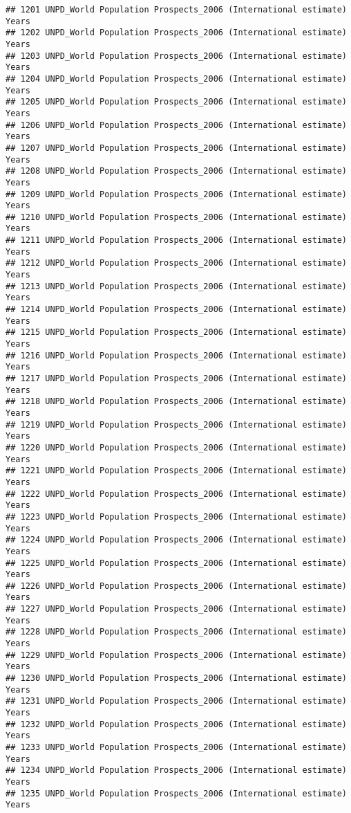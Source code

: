 \documentclass[]{article}
\begin{document}
\begin{verbatim}
## 1201 UNPD_World Population Prospects_2006 (International estimate) Years
## 1202 UNPD_World Population Prospects_2006 (International estimate) Years
## 1203 UNPD_World Population Prospects_2006 (International estimate) Years
## 1204 UNPD_World Population Prospects_2006 (International estimate) Years
## 1205 UNPD_World Population Prospects_2006 (International estimate) Years
## 1206 UNPD_World Population Prospects_2006 (International estimate) Years
## 1207 UNPD_World Population Prospects_2006 (International estimate) Years
## 1208 UNPD_World Population Prospects_2006 (International estimate) Years
## 1209 UNPD_World Population Prospects_2006 (International estimate) Years
## 1210 UNPD_World Population Prospects_2006 (International estimate) Years
## 1211 UNPD_World Population Prospects_2006 (International estimate) Years
## 1212 UNPD_World Population Prospects_2006 (International estimate) Years
## 1213 UNPD_World Population Prospects_2006 (International estimate) Years
## 1214 UNPD_World Population Prospects_2006 (International estimate) Years
## 1215 UNPD_World Population Prospects_2006 (International estimate) Years
## 1216 UNPD_World Population Prospects_2006 (International estimate) Years
## 1217 UNPD_World Population Prospects_2006 (International estimate) Years
## 1218 UNPD_World Population Prospects_2006 (International estimate) Years
## 1219 UNPD_World Population Prospects_2006 (International estimate) Years
## 1220 UNPD_World Population Prospects_2006 (International estimate) Years
## 1221 UNPD_World Population Prospects_2006 (International estimate) Years
## 1222 UNPD_World Population Prospects_2006 (International estimate) Years
## 1223 UNPD_World Population Prospects_2006 (International estimate) Years
## 1224 UNPD_World Population Prospects_2006 (International estimate) Years
## 1225 UNPD_World Population Prospects_2006 (International estimate) Years
## 1226 UNPD_World Population Prospects_2006 (International estimate) Years
## 1227 UNPD_World Population Prospects_2006 (International estimate) Years
## 1228 UNPD_World Population Prospects_2006 (International estimate) Years
## 1229 UNPD_World Population Prospects_2006 (International estimate) Years
## 1230 UNPD_World Population Prospects_2006 (International estimate) Years
## 1231 UNPD_World Population Prospects_2006 (International estimate) Years
## 1232 UNPD_World Population Prospects_2006 (International estimate) Years
## 1233 UNPD_World Population Prospects_2006 (International estimate) Years
## 1234 UNPD_World Population Prospects_2006 (International estimate) Years
## 1235 UNPD_World Population Prospects_2006 (International estimate) Years

\end{verbatim}
\end{document}
